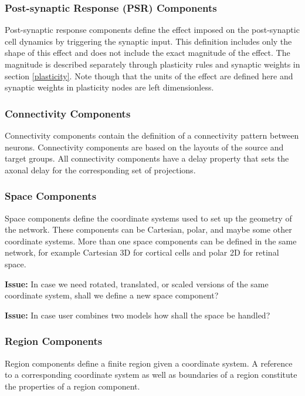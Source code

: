 \documentclass{article}
\newcommand{\issue}[1]{%
\begin{center}
\colorbox{issuecolor}{\parbox{0.8\linewidth}{\textbf{Issue:} #1}}
\end{center}%
}
\begin{document}
\subsubsection{Post-synaptic Response (PSR) Components}
\label{secSynapse}

Post-synaptic response components define the effect imposed on the
post-synaptic cell dynamics by triggering the synaptic input. This
definition includes only the shape of this effect and does not include the
exact magnitude of the effect. The magnitude is described separately through
plasticity rules and synaptic weights in section \ref{plasticity}. Note
though that the units of the effect are defined here and synaptic weights in
plasticity nodes are left dimensionless.

\subsubsection{Connectivity Components}

Connectivity components contain the definition of a connectivity pattern
between neurons. Connectivity components are based on the layouts of the
source and target groups. All connectivity components have a delay property
that sets the axonal delay for the corresponding set of projections.

\subsubsection{Space Components}

Space components define the coordinate systems used to set up the geometry
of the network. These components can be Cartesian, polar, and maybe some other
coordinate systems. More than one space components can be defined in the same
network, for example Cartesian 3D for cortical cells and polar 2D for retinal
space.

\issue{In case we need rotated, translated, or scaled versions of the same
coordinate system, shall we define a new space component?}

\issue{In case user combines two models how shall the space be handled?}

\subsubsection{Region Components}

Region components define a finite region given a coordinate system. A
reference to a corresponding coordinate system as well as boundaries of a
region constitute the properties of a region component.
\end{document}
